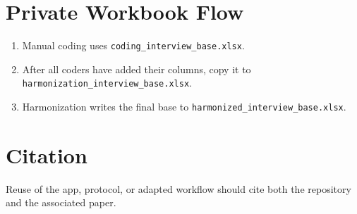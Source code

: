 \documentclass[11pt,a4paper]{article}
\newcommand{\inlinecode}[1]{\texttt{#1}}
\begin{document}
\section*{Private Workbook Flow}

\begin{enumerate}
\item Manual coding uses \inlinecode{coding\_interview\_base.xlsx}.
\item After all coders have added their columns, copy it to \inlinecode{harmonization\_interview\_base.xlsx}.
\item Harmonization writes the final base to \inlinecode{harmonized\_interview\_base.xlsx}.
\end{enumerate}

\section*{Citation}

Reuse of the app, protocol, or adapted workflow should cite both the repository and the associated paper.
\end{document}
